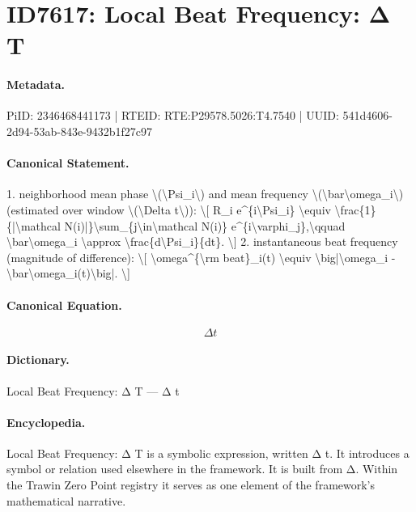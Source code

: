 \section*{ID7617: Local Beat Frequency: Δ T}
\paragraph{Metadata.}
PiID: 2346468441173 | RTEID: RTE:P29578.5026:T4.7540 | UUID: 541d4606-2d94-53ab-843e-9432b1f27c97

\paragraph{Canonical Statement.}
1. neighborhood mean phase \textbackslash{}(\textbackslash{}Psi\_i\textbackslash{}) and mean frequency \textbackslash{}(\textbackslash{}bar\textbackslash{}omega\_i\textbackslash{}) (estimated over window \textbackslash{}(\textbackslash{}Delta t\textbackslash{})): \textbackslash{}[ R\_i e\textasciicircum{}\{i\textbackslash{}Psi\_i\} \textbackslash{}equiv \textbackslash{}frac\{1\}\{|\textbackslash{}mathcal N(i)|\}\textbackslash{}sum\_\{j\textbackslash{}in\textbackslash{}mathcal N(i)\} e\textasciicircum{}\{i\textbackslash{}varphi\_j\},\textbackslash{}qquad \textbackslash{}bar\textbackslash{}omega\_i \textbackslash{}approx \textbackslash{}frac\{d\textbackslash{}Psi\_i\}\{dt\}. \textbackslash{}] 2. instantaneous beat frequency (magnitude of difference): \textbackslash{}[ \textbackslash{}omega\textasciicircum{}\{\textbackslash{}rm beat\}\_i(t) \textbackslash{}equiv \textbackslash{}big|\textbackslash{}omega\_i - \textbackslash{}bar\textbackslash{}omega\_i(t)\textbackslash{}big|. \textbackslash{}]

\paragraph{Canonical Equation.}
\[
\Delta t
\]

\paragraph{Dictionary.}
Local Beat Frequency: Δ T — Δ t

\paragraph{Encyclopedia.}
Local Beat Frequency: Δ T is a symbolic expression, written Δ t. It introduces a symbol or relation used elsewhere in the framework. It is built from Δ. Within the Trawin Zero Point registry it serves as one element of the framework's mathematical narrative.
